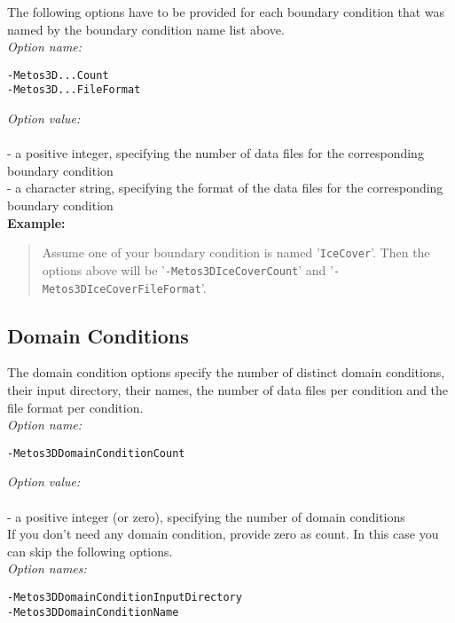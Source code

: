\documentclass{article}
\begin{document}
The following options have to be provided for each boundary condition
that was named by the boundary condition name list above. \\

\emph{Option name:}
\begin{verbatim}
-Metos3D...Count
-Metos3D...FileFormat
\end{verbatim}

\emph{Option value:} \\
\vspace{-0.3cm}\\
- a positive integer, specifying the number of data files for the corresponding boundary condition \\
- a character string, specifying the format of the data files for the corresponding boundary condition \\

\textbf{Example:}
\begin{quote}
Assume one of your boundary condition is named '\texttt{IceCover}'. Then the options
above will be '\texttt{-Metos3DIceCoverCount}' and '\texttt{-Metos3DIceCoverFileFormat}'.
\end{quote}

%
%
\subsection{Domain Conditions}

The domain condition options specify the number of distinct domain conditions,
their input directory, their names, the number of data files per condition
and the file format per condition. \\

\emph{Option name:}
\begin{verbatim}
-Metos3DDomainConditionCount
\end{verbatim}

\emph{Option value:} \\
\vspace{-0.3cm}\\
- a positive integer (or zero), specifying the number of domain conditions \\

If you don't need any domain condition, provide zero as count.
In this case you can skip the following options. \\

\emph{Option names:}
\begin{verbatim}
-Metos3DDomainConditionInputDirectory
-Metos3DDomainConditionName
\end{verbatim}
\end{document}
